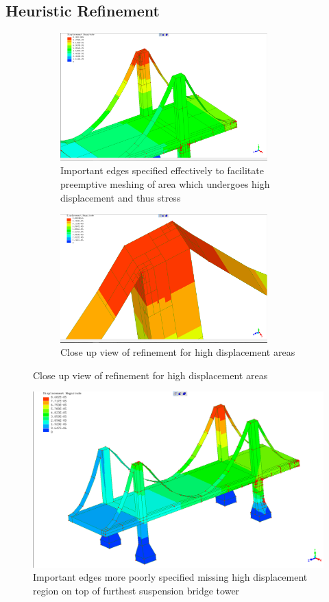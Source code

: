 \subsection{Heuristic Refinement}

\begin{figure}[!h]
\centering
\begin{subfigure}{.5\textwidth}
  \centering
	\includegraphics[width=80mm, scale=0.5]{../Graphics/BridgeCrossLoading/bestEdgeSpecResults.png}
  \caption{Important edges specified effectively to facilitate preemptive meshing of area which undergoes high displacement and thus stress}
  \label{fig:sub1}
\end{subfigure}%
\begin{subfigure}{.5\textwidth}
  \centering
  \centerline{\includegraphics[width=80mm, scale=0.5]{../Graphics/BridgeCrossLoading/bestEdgeSpecResultsCloseUp.png}}
  \caption{Close up view of refinement for high displacement areas }
  \label{fig:sub2}
\end{subfigure}
\label{fig:test}
\end{figure}


\begin{figure}[!h]
  \centerline{\includegraphics[width=165mm, scale=0.5]{../Graphics/BridgeCrossLoading/okEdgeSpecResults.png}}
  \caption{Important edges more poorly specified missing high displacement region on top of furthest suspension bridge tower}
\end{figure}

